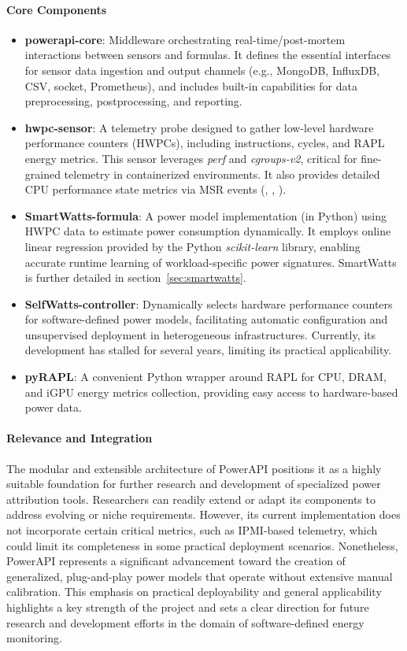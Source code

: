 \paragraph{Core Components}
\begin{itemize}
    \item \textbf{powerapi-core}: Middleware orchestrating real-time/post-mortem interactions between sensors and formulas. It defines the essential interfaces for sensor data ingestion and output channels (e.g., MongoDB, InfluxDB, CSV, socket, Prometheus), and includes built-in capabilities for data preprocessing, postprocessing, and reporting.
    \item \textbf{hwpc-sensor}: A telemetry probe designed to gather low-level hardware performance counters (HWPCs), including instructions, cycles, and RAPL energy metrics. This sensor leverages \textit{perf} and \textit{cgroups-v2}, critical for fine-grained telemetry in containerized environments. It also provides detailed CPU performance state metrics via MSR events (, , ).
    \item \textbf{SmartWatts-formula}\parencite{fieni2020smartwatts}: A power model implementation (in Python) using HWPC data to estimate power consumption dynamically. It employs online linear regression provided by the Python \textit{scikit-learn}\parencite{scikit-learn} library, enabling accurate runtime learning of workload-specific power signatures. SmartWatts is further detailed in section~\ref{sec:smartwatts}.
    \item \textbf{SelfWatts-controller}: Dynamically selects hardware performance counters for software-defined power models, facilitating automatic configuration and unsupervised deployment in heterogeneous infrastructures. Currently, its development has stalled for several years, limiting its practical applicability.
    \item \textbf{pyRAPL}: A convenient Python wrapper around RAPL for CPU, DRAM, and iGPU energy metrics collection, providing easy access to hardware-based power data.
\end{itemize}

\paragraph{Relevance and Integration}
The modular and extensible architecture of PowerAPI positions it as a highly suitable foundation for further research and development of specialized power attribution tools. Researchers can readily extend or adapt its components to address evolving or niche requirements. However, its current implementation does not incorporate certain critical metrics, such as IPMI-based telemetry, which could limit its completeness in some practical deployment scenarios. Nonetheless, PowerAPI represents a significant advancement toward the creation of generalized, plug-and-play power models that operate without extensive manual calibration. This emphasis on practical deployability and general applicability highlights a key strength of the project and sets a clear direction for future research and development efforts in the domain of software-defined energy monitoring.

